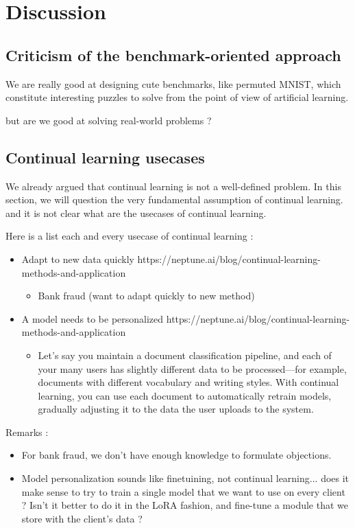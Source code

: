 \documentclass[twocolumn]{article}
\begin{document}
\section{Discussion}

\subsection{Criticism of the benchmark-oriented approach}

We are really good at designing cute benchmarks, like permuted MNIST, which constitute interesting puzzles to solve from the point of view of artificial learning.

but are we good at solving real-world problems ?

\subsection{Continual learning usecases}

We already argued that continual learning is not a well-defined problem. In this section, we will question the very fundamental assumption of continual learning. and it is not clear what are the usecases of continual learning.

Here is a list each and every usecase of continual learning :
\begin{itemize}
    \item Adapt to new data quickly https://neptune.ai/blog/continual-learning-methods-and-application
        \begin{itemize}
            \item Bank fraud (want to adapt quickly to new method)
        \end{itemize}
    \item A model needs to be personalized https://neptune.ai/blog/continual-learning-methods-and-application
        \begin{itemize}
            \item Let’s say you maintain a document classification pipeline, and each of your many users has slightly different data to be processed—for example, documents with different vocabulary and writing styles. With continual learning, you can use each document to automatically retrain models, gradually adjusting it to the data the user uploads to the system.
        \end{itemize}
\end{itemize}

Remarks :
\begin{itemize}
    \item For bank fraud, we don't have enough knowledge to formulate objections.
    \item Model personalization sounds like finetuining, not continual learning... does it make sense to try to train a single model that we want to use on every client ? Isn't it better to do it in the LoRA fashion, and fine-tune a module that we store with the  client's data ?
\end{itemize}
\end{document}
